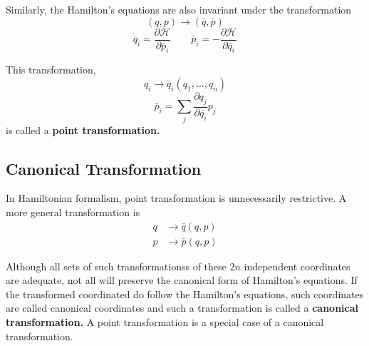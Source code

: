 \documentclass[12pt,a4paper]{report}
\newcommand{\parder}[2]{\frac{\partial#1}{\partial#2}}
\newcommand{\hamiltonian}{\mathcal{H}}
\begin{document}
Similarly, the Hamilton's equations are also invariant under the transformation
\begin{equation*}
    (q, p) \to (\bar{q}, \bar{p})
\end{equation*}
\begin{equation*}
    \dot{\bar{q}}_i = \parder{\hamiltonian}{\bar{p}_i} \qquad \dot{\bar{p}}_i = -\parder{\hamiltonian}{\bar{q}_i}
\end{equation*}

This transformation,
\begin{equation*}
    q_i \to \bar{q}_i(q_1, \dots, q_n)
\end{equation*}
\begin{equation*}
    \bar{p}_i = \sum_{j}\parder{q_j}{\bar{q_i}} p_j
\end{equation*}
is called a \textbf{point transformation.}

\subsection{Canonical Transformation}

In Hamiltonian formalism, point transformation is unnecessarily restrictive. A more general transformation is
\begin{align*}
    q &\to \bar{q}(q, p) \\
    p &\to \bar{p}(q, p)
\end{align*}

Although all sets of such transformationss of these $2n$ independent coordinates are adequate, not all will preserve the canonical form of Hamilton's equations.
If the transformed coordinated do follow the Hamilton's equations, such coordinates are called canonical coordinates and such a transformation is called a \textbf{canonical transformation.}
A point transformation is a special case of a canonical transformation.
\end{document}

